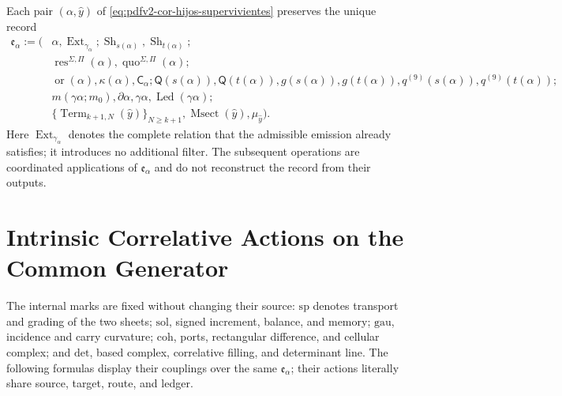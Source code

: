 Each pair \((\alpha,\widehat y)\) of
\eqref{eq:pdfv2-cor-hijos-supervivientes} preserves the unique record
\begin{equation}
\label{eq:pdfv2-cor-registro-extension}
 \begin{aligned}
 \mathfrak e_\alpha:=\bigl(&
 \alpha,\operatorname{Ext}_{\gamma_\alpha};
 \operatorname{Sh}_{s(\alpha)},\operatorname{Sh}_{t(\alpha)};\\
 &
 \operatorname{res}^{\Sigma,\Pi}(\alpha),
 \operatorname{quo}^{\Sigma,\Pi}(\alpha);\\
 &\operatorname{or}(\alpha),\kappa(\alpha),\mathsf C_\alpha;
 \mathsf Q(s(\alpha)),\mathsf Q(t(\alpha)),g(s(\alpha)),g(t(\alpha)),
 q^{(9)}(s(\alpha)),q^{(9)}(t(\alpha));\\
 &
 m(\gamma\alpha;m_0),\partial\alpha,\gamma\alpha,
 \operatorname{Led}(\gamma\alpha);\\
 &\{\operatorname{Term}_{k+1,N}(\widehat y)\}_{N\geq k+1},
 \operatorname{Msect}(\widehat y),\mu_{\widehat y}\bigr).
 \end{aligned}
\end{equation}
Here \(\operatorname{Ext}_{\gamma_\alpha}\) denotes the complete relation that
the admissible emission already satisfies; it introduces no additional filter. The subsequent
operations are coordinated applications of \(\mathfrak e_\alpha\) and do not
reconstruct the record from their outputs.

\section{Intrinsic Correlative Actions on the Common Generator}

The internal marks are fixed without changing their source: \(\mathrm{sp}\) denotes transport and grading of the two sheets; \(\mathrm{sol}\), signed increment, balance, and memory; \(\mathrm{gau}\), incidence and carry curvature; \(\mathrm{coh}\), ports, rectangular difference, and cellular complex; and \(\mathrm{det}\), based complex, correlative filling, and determinant line. The following formulas display their couplings over the same \(\mathfrak e_\alpha\); their actions literally share source, target, route, and ledger.

